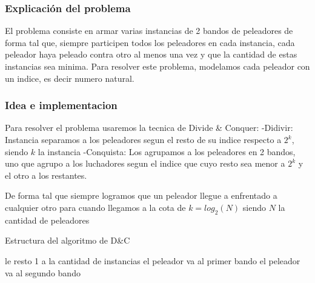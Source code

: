 \subsubsection{Explicación del problema}
El problema consiste en armar varias instancias de 2 bandos de peleadores de forma tal que, siempre participen todos los peleadores en cada instancia, cada peleador haya peleado contra otro al menos una vez y que la cantidad de estas instancias sea minima.
Para resolver este problema, modelamos cada peleador con un indice, es decir numero natural.
\subsubsection{Idea e implementacion}
Para resolver el problema usaremos la tecnica de Divide \& Conquer:
-Didivir: Instancia separamos a los peleadores segun el resto de su indice respecto a $2^k$, siendo $k$ la instancia
-Conquista: Los agrupamos a los peleadores en 2 bandos, uno que agrupo a los luchadores segun el indice que cuyo resto sea menor a $2^k$ y el otro a los restantes.

De forma tal que siempre logramos que un peleador llegue a enfrentado a cualquier otro para cuando llegamos a la cota de $k = log_2 (N)$ siendo $N$ la cantidad de peleadores


\begin{algorithm}[h!]
\caption{Estructura del algoritmo de D\&C}
\begin{algorithmic}[1]
		\State le resto 1 a la cantidad de instancias 
	\EndIf
            \State el peleador va al primer bando
        \Else
        	\State el peleador va al segundo bando
        \EndIf
        \EndFor
	\EndFor
	\EndFunction
\end{algorithmic}
\end{algorithm}
